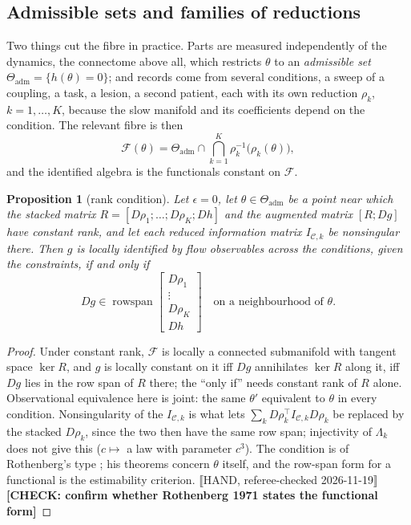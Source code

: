 \documentclass[10pt]{article}
\newtheorem{proposition}{Proposition}
\newcommand{\CHECK}[1]{\textcolor{purple!70!black}{\textbf{[CHECK: #1]}}}
\begin{document}
\subsection{Admissible sets and families of reductions}
Two things cut the fibre in practice. Parts are measured independently of the dynamics, the connectome above all, which restricts $\theta$ to an \emph{admissible set} $\Theta_{\mathrm{adm}}=\{h(\theta)=0\}$; and records come from several conditions, a sweep of a coupling, a task, a lesion, a second patient, each with its own reduction $\rho_k$, $k=1,\dots,K$, because the slow manifold and its coefficients depend on the condition. The relevant fibre is then
\begin{equation}
\mathcal{F}(\theta)=\Theta_{\mathrm{adm}}\cap\bigcap_{k=1}^{K}\rho_k^{-1}\bigl(\rho_k(\theta)\bigr),
\label{eq:jointfibre}
\end{equation}
and the identified algebra is the functionals constant on $\mathcal{F}$.
\begin{proposition}[rank condition]
Let $\epsilon=0$, let $\theta\in\Theta_{\mathrm{adm}}$ be a point near which the stacked matrix $R=[D\rho_1;\dots;D\rho_K;Dh]$ and the augmented matrix $[R;Dg]$ have constant rank, and let each reduced information matrix $I_{\mathcal{C},k}$ be nonsingular there. Then $g$ is locally identified by flow observables across the conditions, given the constraints, if and only if
\begin{equation}
Dg\in\operatorname{rowspan}\begin{bmatrix}D\rho_1\\ \vdots\\ D\rho_K\\ Dh\end{bmatrix}\quad\text{on a neighbourhood of }\theta.
\label{eq:rank}
\end{equation}
\end{proposition}
\begin{proof}
Under constant rank, $\mathcal{F}$ is locally a connected submanifold with tangent space $\ker R$, and $g$ is locally constant on it iff $Dg$ annihilates $\ker R$ along it, iff $Dg$ lies in the row span of $R$ there; the ``only if'' needs constant rank of $R$ alone. Observational equivalence here is joint: the same $\theta'$ equivalent to $\theta$ in every condition. Nonsingularity of the $I_{\mathcal{C},k}$ is what lets $\sum_k D\rho_k^{\top}I_{\mathcal{C},k}D\rho_k$ be replaced by the stacked $D\rho_k$, since the two then have the same row span; injectivity of $\Lambda_k$ does not give this ($c\mapsto$ a law with parameter $c^3$). The condition is of Rothenberg's type \parencite{rothenberg1971}; his theorems concern $\theta$ itself, and the row-span form for a functional is the estimability criterion. \hfill⟦HAND, referee-checked 2026-11-19⟧ \CHECK{confirm whether Rothenberg 1971 states the functional form}
\end{proof}
\end{document}

